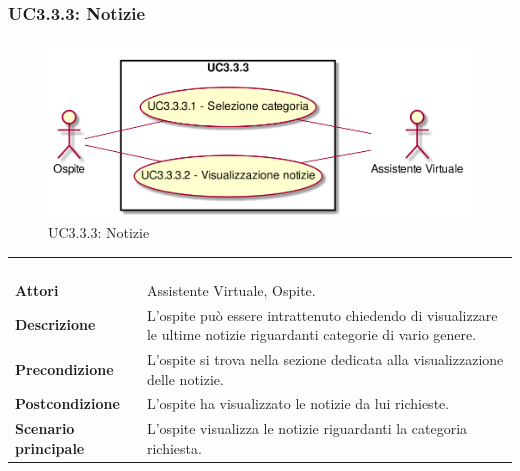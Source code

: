 \newpage\subsubsection{UC3.3.3: Notizie}
\label{UC3.3.3}
\begin{figure}[h]
	\centering
	\includegraphics[width=\textwidth,height=\textheight,keepaspectratio]{images/UseCaseUC333.png}
	\caption{UC3.3.3: Notizie}
\end{figure}
\begin{longtable}{l|p{10cm}}
	\rowcolor[gray]{0.8} \multicolumn{2}{c}{} \\
	\rowcolor[gray]{0.8} \multicolumn{2}{c}{\textbf{UC3.3.3 - Notizie}} \\
	\rowcolor[gray]{0.8} \multicolumn{2}{c}{} \\
	\hline
	&\\
	\textbf{Attori} & Assistente Virtuale, Ospite.\\[7pt]
	\textbf{Descrizione} & L'ospite può essere intrattenuto chiedendo di visualizzare le ultime notizie riguardanti categorie di vario genere.\\[7pt]
	\textbf{Precondizione} & L'ospite si trova nella sezione dedicata alla visualizzazione delle notizie.\\[7pt]
	\textbf{Postcondizione} & L'ospite ha visualizzato le notizie da lui richieste.\\[7pt]
	\textbf{Scenario principale} &L'ospite visualizza le notizie riguardanti la categoria richiesta.\\[7pt]\hline
\end{longtable}

